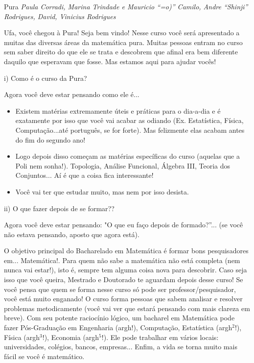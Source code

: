 \begin{subsecao}{Pura}
{\em Paula Corradi, Marina Trindade e Mauricio ``=o)'' Camilo,
Andre “Shinji” Rodrigues, David, Vinicius Rodrigues}


Ufa, você chegou à Pura! Seja bem vindo! Nesse curso você será apresentado a muitas das diversas áreas da matemática pura. Muitas pessoas entram no curso sem saber direito do que ele se trata e descobrem que afinal era bem diferente daquilo que esperavam que fosse. Mas estamos aqui para ajudar vocês!

i) Como é o curso da Pura?

Agora você deve estar pensando como ele é...
\begin{itemize}


\item  Existem matérias extremamente úteis e práticas para o dia-a-dia e é
exatamente por isso que você vai acabar as odiando (Ex. Estatística, Física,
Computação...até português, se for forte). Mas felizmente elas acabam antes do fim do segundo ano!
\item  Logo depois disso começam as matérias específicas do curso (aquelas que a Poli nem sonha!). Topologia, Análise Funcional, Álgebra III, Teoria dos Conjuntos... Aí é que a coisa fica interessante!
\item  Você vai ter que estudar muito, mas nem por isso desista.

\end{itemize}
ii) O que fazer depois de se formar??

Agora você deve estar pensando: "O que eu faço depois de formado?”... (se você
não estava pensando, aposto que agora está).

O objetivo principal do Bacharelado em Matemática é formar bons pesquisadores em... Matemática!. Para quem não
sabe a matemática não está completa (nem nunca vai estar!), isto é, sempre tem alguma coisa nova para
descobrir. Caso seja isso que você queira, Mestrado e Doutorado te aguardam depois desse curso! Se você pensa que quem se forma nesse curso só pode ser
professor/pesquisador, você está muito enganado! O curso forma pessoas que
sabem analisar e resolver problemas metodicamente (você vai ver que estará
pensando com mais clareza em breve). Com seu potente raciocínio lógico, um
bacharel em Matemática pode fazer Pós-Graduação em Engenharia (argh!),
Computação, Estatística (argh$^2$!), Física (argh$^3$!), Economia (argh$^5$!).
Ele pode trabalhar em vários locais: universidades, colégios, bancos,
empresas... Enfim, a vida se torna muito mais fácil se você é matemático.


\end{subsecao}
